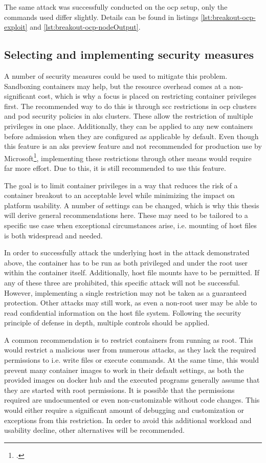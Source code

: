 The same attack was successfully conducted on the \gls{ocp} setup, only the commands used differ slightly. Details can be found in listings \ref{lst:breakout-ocp-exploit} and \ref{lst:breakout-ocp-nodeOutput}.

\subsection{Selecting and implementing security measures} \label{measures2}
A number of security measures could be used to mitigate this problem.
Sandboxing containers may help, but the resource overhead comes at a non-significant cost, which is why a focus is placed on restricting container privileges first.
The recommended way to do this is through \gls{scc} restrictions in \gls{ocp} clusters and pod security policies in \gls{aks} clusters. These allow the restriction of multiple privileges in one place. Additionally, they can be applied to any new containers before admission when they are configured as applicable by default.
Even though this feature is an \gls{aks} preview feature and not recommended for production use by Microsoft\footcite[][, second paragraph with the headline 'important']{aksPodSecPol}, implementing these restrictions through other means would require far more effort. Due to this, it is still recommended to use this feature.

The goal is to limit container privileges in a way that reduces the risk of a container breakout to an acceptable level while minimizing the impact on platform usability.
A number of settings can be changed, which is why this thesis will derive general recommendations here. These may need to be tailored to a specific use case when exceptional circumstances arise, i.e. mounting of host files is both widespread and needed.

In order to successfully attack the underlying host in the attack demonstrated above, the container has to be run as both privileged and under the root user within the container itself. Additionally, host file mounts have to be permitted. If any of these three are prohibited, this specific attack will not be successful. However, implementing a single restriction may not be taken as a guaranteed protection. Other attacks may still work, as even a non-root user may be able to read confidential information on the host file system. Following the security principle of defense in depth, multiple controls should be applied.

A common recommendation is to restrict containers from running as root. This would restrict a malicious user from numerous attacks, as they lack the required permissions to i.e. write files or execute commands. At the same time, this would prevent many container images to work in their default settings, as both the provided images on docker hub and the executed programs generally assume that they are started with root permissions. It is possible that the permissions required are undocumented or even non-customizable without code changes. This would either require a significant amount of debugging and customization or exceptions from this restriction. In order to avoid this additional workload and usability decline, other alternatives will be recommended.

